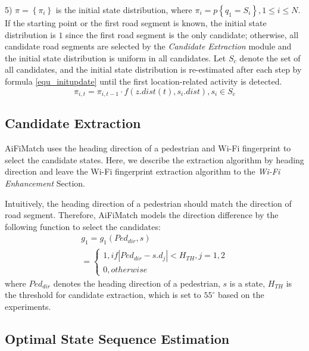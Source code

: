 \documentclass[conference]{IEEEtran}
\begin{document}
5) $\pi  = \left\{ {{\pi _i}} \right\}$ is the initial state distribution, where ${\pi _i} = p\left\{ {{q_1} = {S_i}} \right\},1 \le i \le N$. If the starting point or the first road segment is known, the initial state distribution is $1$ since the first road segment is the only candidate; otherwise, all candidate road segments are selected by the \emph{Candidate Extraction} module and the initial state distribution is uniform in all candidates. Let $S_c$ denote the set of all candidates, and the initial state distribution is re-estimated after each step by formula \ref{equ_initupdate} until the first location-related activity is detected.
\begin{equation}
\label{equ_initupdate}
{\pi _{i,t}} = {\pi _{i,t - 1}} \cdot f(z.dist(t),{s_i}.dist),{s_i} \in {S_c}
\end{equation}

\subsection{Candidate Extraction}

AiFiMatch uses the heading direction of a pedestrian and Wi-Fi fingerprint to select the candidate states. Here, we describe the extraction algorithm by heading direction and leave the Wi-Fi fingerprint extraction algorithm to the \emph{Wi-Fi Enhancement} Section.

Intuitively, the heading direction of a pedestrian should match the direction of road segment. Therefore, AiFiMatch models the direction difference by the following function to select the candidates:
\begin{equation}
\begin{array}{l}
{g_1} = {g_1}(Pe{d_{dir}},s)\\
= \left\{ {\begin{array}{*{20}{l}}
	{1,if\left| {Pe{d_{dir}} - s.{d_j}} \right| < {H_{TH}},j = 1,2}\\
	{0,otherwise}
	\end{array}} \right.
\end{array}
\end{equation}
where $Ped_{dir}$ denotes the heading direction of a pedestrian, $s$ is a state, $H_{TH}$ is the threshold for candidate extraction, which is set to $55^\circ$ based on the experiments.

\subsection{Optimal State Sequence Estimation}
\end{document}
